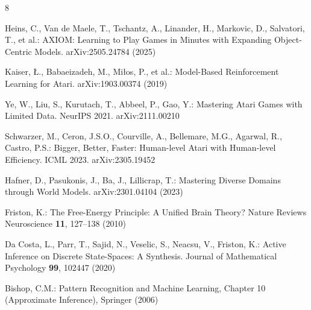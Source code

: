 \documentclass[runningheads]{llncs}
\begin{document}
\begin{thebibliography}{8}

Heins, C., Van de Maele, T., Tschantz, A., Linander, H., Markovic, D.,
Salvatori, T., et al.: AXIOM: Learning to Play Games in Minutes with
Expanding Object-Centric Models. arXiv:2505.24784 (2025)

Kaiser, {\L}., Babaeizadeh, M., Mi{\l}os, P., et al.: Model-Based
Reinforcement Learning for Atari. arXiv:1903.00374 (2019)

Ye, W., Liu, S., Kurutach, T., Abbeel, P., Gao, Y.: Mastering Atari
Games with Limited Data. NeurIPS 2021. arXiv:2111.00210

Schwarzer, M., Ceron, J.S.O., Courville, A., Bellemare, M.G.,
Agarwal, R., Castro, P.S.: Bigger, Better, Faster: Human-level
Atari with Human-level Efficiency. ICML 2023. arXiv:2305.19452

Hafner, D., Pasukonis, J., Ba, J., Lillicrap, T.: Mastering Diverse
Domains through World Models. arXiv:2301.04104 (2023)

Friston, K.: The Free-Energy Principle: A Unified Brain Theory?
Nature Reviews Neuroscience \textbf{11}, 127--138 (2010)

Da Costa, L., Parr, T., Sajid, N., Veselic, S., Neacsu, V., Friston,
K.: Active Inference on Discrete State-Spaces: A Synthesis. Journal
of Mathematical Psychology \textbf{99}, 102447 (2020)

Bishop, C.M.: Pattern Recognition and Machine Learning, Chapter 10
(Approximate Inference), Springer (2006)

\end{thebibliography}
\end{document}
